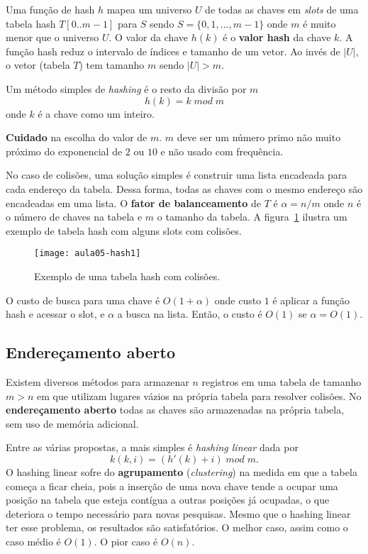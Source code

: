 Uma função de hash $h$ mapea um universo $U$  de todas as chaves em 
\emph{slots} de uma tabela hash $T[0..m-1]$ para $S$ sendo
$S = \{0, 1, ..., m-1\}$ onde $m$ é muito menor que o universo $U$.
O valor da chave $h(k)$ é o {\bf valor hash} da chave $k$.
A função hash reduz o intervalo de índices e tamanho de um vetor.
Ao invés de $|U|$, o vetor (tabela $T$) tem tamanho $m$ sendo $|U| > m$.

Um método simples de \emph{hashing} é o resto da divisão por $m$
\begin{equation*}
h(k) = k\; mod\; m
\end{equation*}
onde $k$ é a chave como um inteiro.

{\bf Cuidado} na escolha do valor de $m$. $m$ deve ser um número primo não muito
próximo do exponencial de $2$ ou $10$ e não usado com frequência.

No caso de colisões, uma solução simples é construir uma lista 
encadeada para cada endereço da tabela.
Dessa forma, todas as chaves com o mesmo endereço são encadeadas em uma lista.
O {\bf fator de balanceamento} de $T$ é $\alpha = n/m$ onde $n$ é o número
de chaves na tabela e $m$ o tamanho da tabela.
A figura~\ref{aula05:fig:hash} ilustra um exemplo de tabela hash com alguns
slots com colisões.
%
\begin{figure}[ht]
\centering
\texttt{[image: aula05-hash1]}
\caption{Exemplo de uma tabela hash com colisões.}
\label{aula05:fig:hash}
\end{figure}

O custo de busca para uma chave é $O(1 + \alpha)$ onde custo $1$ é aplicar
a função hash e acessar o slot, e $\alpha$ a busca na lista.
Então, o custo é $O(1)$ se $\alpha = O(1)$.

\subsection{Endereçamento aberto}

Existem diversos métodos para armazenar $n$ registros em uma tabela de tamanho
$m > n$ em que utilizam lugares vázios na própria tabela para resolver
colisões.
No {\bf endereçamento aberto} todas as chaves são armazenadas na própria 
tabela, sem uso de memória adicional.

Entre as várias propostas, a mais simples é \emph{hashing linear} dada por
\begin{equation*}
k(k,i) = (h'(k) + i)\; mod \; m.
\end{equation*}
O hashing linear sofre do {\bf agrupamento} (\emph{clustering}) na medida
em que a tabela começa a ficar cheia, pois a inserção de uma nova chave tende
a ocupar uma posição na tabela que esteja contígua a outras posições já ocupadas,
o que deteriora o tempo necessário para novas pesquisas.
Mesmo que o hashing linear ter esse problema, os resultados são satisfatórios.
O melhor caso, assim como o caso médio é $O(1)$.
O pior caso é $O(n)$.


